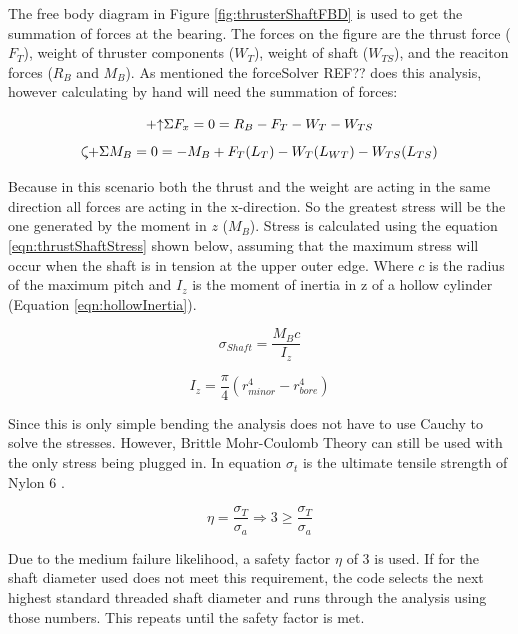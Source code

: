 \documentclass[../main.tex]{subfiles}
\begin{document}
The free body diagram in Figure \ref{fig:thrusterShaftFBD} is used to get the summation of forces at the bearing. The forces on the figure are the thrust force ($F_T$), weight of thruster components ($W_T$), weight of shaft ($W_{TS}$), and the reaciton forces ($R_B$ and $M_B$). As mentioned the forceSolver REF?? does this analysis, however calculating by hand will need the summation of forces:

\begin{equation}
\label{eqn:thrustShaftFx} 
\mathbin{+\mathord\uparrow} \Sigma F_x  = 0 = R_B - F_T - W_T - W_{TS}
\end{equation}
\begin{equation}
\label{eqn:thrustShaftMB} 
\curveplus \Sigma M_B = 0 = -M_B + F_T(L_T) - W_T(L_{WT}) - W_{TS}(L_{TS})
\end{equation}

Because in this scenario both the thrust and the weight are acting in the same direction all forces are acting in the x-direction. So the greatest stress will be the one generated by the moment in $z$ ($M_B$). Stress is calculated using the equation \ref{eqn:thrustShaftStress} shown below, assuming that the maximum stress will occur when the shaft is in tension at the upper outer edge. Where $c$ is the radius of the maximum pitch and $I_z$ is the moment of inertia in z of a hollow cylinder (Equation \ref{eqn:hollowInertia}).

\begin{equation}
\label{eqn:thrustShaftStress} 
\sigma _{Shaft}  = \dfrac{M_{B}c}{I_z} 
\end{equation}

\begin{equation}
\label{eqn:hollowInertia} 
I _{z}  = \dfrac{\pi}{4} (r_{minor}^4 - r_{bore}^4)
\end{equation}

Since this is only simple bending the analysis does not have to use Cauchy to solve the stresses. However, Brittle Mohr-Coulomb Theory \cite[227]{shigley} can still be used with the only stress being plugged in. In equation $\sigma_{t}$ is the ultimate tensile strength of Nylon 6 \cite{Nylon6}.

\begin{equation}
\eta = \dfrac{\sigma_{T}}{\sigma _a} \Rightarrow 3 \geq \dfrac{\sigma_{T}}{\sigma _a}
\end{equation}

Due to the medium failure likelihood, a safety factor $\eta$ of 3 is used. If for the shaft diameter used does not meet this requirement, the code selects the next highest standard threaded shaft diameter and runs through the analysis using those numbers. This repeats until the safety factor is met. 
\end{document}
